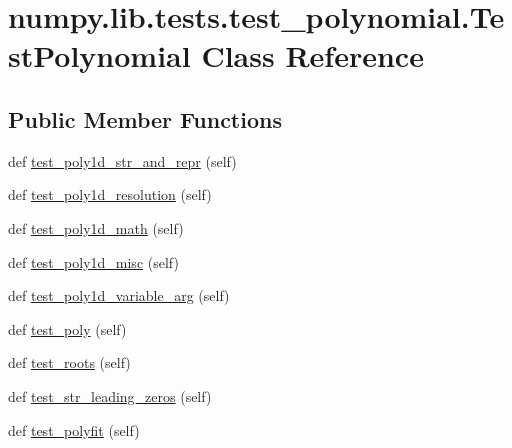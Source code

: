 \hypertarget{classnumpy_1_1lib_1_1tests_1_1test__polynomial_1_1TestPolynomial}{}\section{numpy.\+lib.\+tests.\+test\+\_\+polynomial.\+Test\+Polynomial Class Reference}
\label{classnumpy_1_1lib_1_1tests_1_1test__polynomial_1_1TestPolynomial}
\subsection*{Public Member Functions}
\begin{DoxyCompactItemize}
\item 
def \hyperlink{classnumpy_1_1lib_1_1tests_1_1test__polynomial_1_1TestPolynomial_a8e77f3d08722a4ae1622ea810b437002}{test\+\_\+poly1d\+\_\+str\+\_\+and\+\_\+repr} (self)
\item 
def \hyperlink{classnumpy_1_1lib_1_1tests_1_1test__polynomial_1_1TestPolynomial_aeafaa58393e954a56cc83db9722669ee}{test\+\_\+poly1d\+\_\+resolution} (self)
\item 
def \hyperlink{classnumpy_1_1lib_1_1tests_1_1test__polynomial_1_1TestPolynomial_af546f612b8ddc35150c80b6c849ec621}{test\+\_\+poly1d\+\_\+math} (self)
\item 
def \hyperlink{classnumpy_1_1lib_1_1tests_1_1test__polynomial_1_1TestPolynomial_a1021f9cebfaf5a36706f79f5d7417729}{test\+\_\+poly1d\+\_\+misc} (self)
\item 
def \hyperlink{classnumpy_1_1lib_1_1tests_1_1test__polynomial_1_1TestPolynomial_a2e3c2e9cffb5d7688169df1961e1d4af}{test\+\_\+poly1d\+\_\+variable\+\_\+arg} (self)
\item 
def \hyperlink{classnumpy_1_1lib_1_1tests_1_1test__polynomial_1_1TestPolynomial_a48c3e747d9e9424f43aae541687530d9}{test\+\_\+poly} (self)
\item 
def \hyperlink{classnumpy_1_1lib_1_1tests_1_1test__polynomial_1_1TestPolynomial_a647899a12304c420e8df79ea43b75bb3}{test\+\_\+roots} (self)
\item 
def \hyperlink{classnumpy_1_1lib_1_1tests_1_1test__polynomial_1_1TestPolynomial_ab100ae4fb30200f05eec4b74d092914d}{test\+\_\+str\+\_\+leading\+\_\+zeros} (self)
\item 
def \hyperlink{classnumpy_1_1lib_1_1tests_1_1test__polynomial_1_1TestPolynomial_a767ec3330c21fa57ddf2319120d02b25}{test\+\_\+polyfit} (self)
\item 

\end{DoxyCompactItemize}
